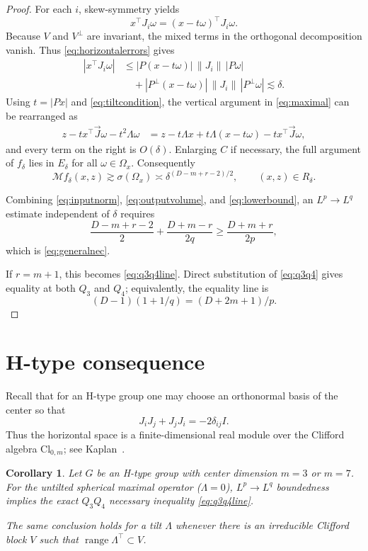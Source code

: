 \documentclass[11pt]{article}
\newtheorem{corollary}[theorem]{Corollary}
\newcommand{\cM}{\mathcal M}
\newcommand{\Cl}{\mathrm{Cl}}
\begin{document}
\begin{proof}
For each $i$, skew-symmetry yields
\[
 x^\intercal J_i\omega=(x-t\omega)^\intercal J_i\omega.
\]
Because $V$ and $V^\perp$ are invariant, the mixed terms in the orthogonal
decomposition vanish.  Thus \eqref{eq:horizontalerrors} gives
\begin{align*}
 |x^\intercal J_i\omega|
 &\leq |P(x-t\omega)|\,\|J_i\|\,|P\omega|\\
 &\quad+|P^\perp(x-t\omega)|\,\|J_i\|\,|P^\perp\omega|
 \lesssim\delta.
\end{align*}
Using $t=|Px|$ and \eqref{eq:tiltcondition}, the vertical argument in
\eqref{eq:maximal} can be rearranged as
\begin{align*}
 z-tx^\intercal\vec J\omega-t^2\Lambda\omega
 &=z-t\Lambda x+t\Lambda(x-t\omega)
   -t x^\intercal\vec J\omega,
\end{align*}
and every term on the right is $O(\delta)$.  Enlarging $C$ if necessary,
the full argument of $f_\delta$ lies in $E_\delta$ for all
$\omega\in\Omega_x$.  Consequently
\begin{equation}\label{eq:lowerbound}
 \cM f_\delta(x,z)\gtrsim\sigma(\Omega_x)
 \asymp\delta^{(D-m+r-2)/2},
 \qquad (x,z)\in R_\delta.
\end{equation}

Combining \eqref{eq:inputnorm}, \eqref{eq:outputvolume}, and
\eqref{eq:lowerbound}, an $L^p\to L^q$ estimate independent of $\delta$
requires
\[
 \frac{D-m+r-2}{2}+\frac{D+m-r}{2q}
 \geq\frac{D+m+r}{2p},
\]
which is \eqref{eq:generalnec}.

If $r=m+1$, this becomes \eqref{eq:q3q4line}.  Direct substitution of
\eqref{eq:q3q4} gives equality at both $Q_3$ and $Q_4$; equivalently, the
equality line is
\[
 (D-1)(1+1/q)=(D+2m+1)/p.
\]
\end{proof}

\section{H-type consequence}

Recall that for an H-type group one may choose an orthonormal basis of the
center so that
\begin{equation}\label{eq:clifford}
 J_iJ_j+J_jJ_i=-2\delta_{ij}I.
\end{equation}
Thus the horizontal space is a finite-dimensional real module over the
Clifford algebra $\Cl_{0,m}$; see Kaplan~\cite{Kaplan}.

\begin{corollary}\label{cor:htype}
Let $G$ be an H-type group with center dimension $m=3$ or $m=7$.
For the untilted spherical maximal operator ($\Lambda=0$), $L^p\to L^q$
boundedness implies the exact $Q_3Q_4$ necessary inequality
\eqref{eq:q3q4line}.

The same conclusion holds for a tilt $\Lambda$ whenever there is an
irreducible Clifford block $V$ such that
$\operatorname{range}\Lambda^\intercal\subset V$.
\end{corollary}
\end{document}
